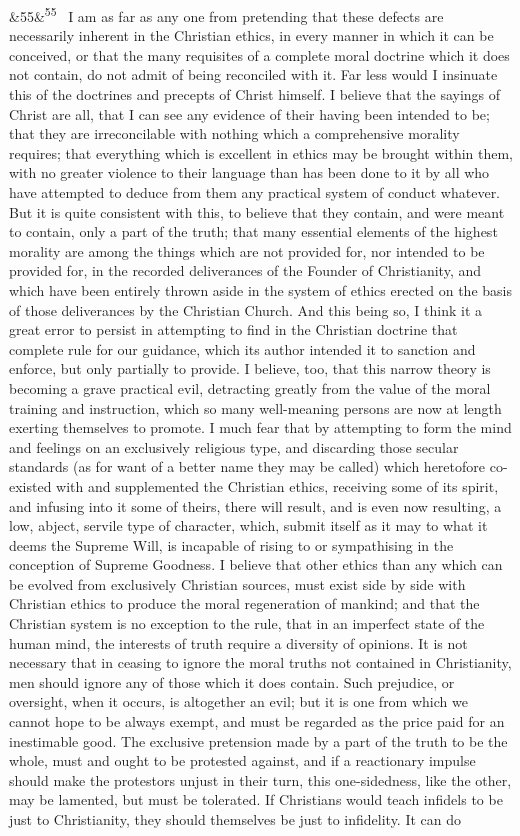 \documentclass[12pt]{article}
\newcommand{\para}[1][]{\par\noindent\ifx&#1&\else\textsuperscript{\footnotesize #1}~\fi}
\begin{document}
\para[55] I am as far as any one from pretending that these defects are necessarily inherent in the Christian ethics, in every manner in which it can be conceived, or that the many requisites of a complete moral doctrine which it does not contain, do not admit of being reconciled with it. Far less would I insinuate this of the doctrines and precepts of Christ himself. I believe that the sayings of Christ are all, that I can see any evidence of their having been intended to be; that they are irreconcilable with nothing which a comprehensive morality requires; that everything which is excellent in ethics may be brought within them, with no greater violence to their language than has been done to it by all who have attempted to deduce from them any practical system of conduct whatever. But it is quite consistent with this, to believe that they contain, and were meant to contain, only a part of the truth; that many essential elements of the highest morality are among the things which are not provided for, nor intended to be provided for, in the recorded deliverances of the Founder of Christianity, and which have been entirely thrown aside in the system of ethics erected on the basis of those deliverances by the Christian Church. And this being so, I think it a great error to persist in attempting to find in the Christian doctrine that complete rule for our guidance, which its author intended it to sanction and enforce, but only partially to provide. I believe, too, that this narrow theory is becoming a grave practical evil, detracting greatly from the value of the moral training and instruction, which so many well-meaning persons are now at length exerting themselves to promote. I much fear that by attempting to form the mind and feelings on an exclusively religious type, and discarding those secular standards (as for want of a better name they may be called) which heretofore co-existed with and supplemented the Christian ethics, receiving some of its spirit, and infusing into it some of theirs, there will result, and is even now resulting, a low, abject, servile type of character, which, submit itself as it may to what it deems the Supreme Will, is incapable of rising to or sympathising in the conception of Supreme Goodness. I believe that other ethics than any which can be evolved from exclusively Christian sources, must exist side by side with Christian ethics to produce the moral regeneration of mankind; and that the Christian system is no exception to the rule, that in an imperfect state of the human mind, the interests of truth require a diversity of opinions. It is not necessary that in ceasing to ignore the moral truths not contained in Christianity, men should ignore any of those which it does contain. Such prejudice, or oversight, when it occurs, is altogether an evil; but it is one from which we cannot hope to be always exempt, and must be regarded as the price paid for an inestimable good. The exclusive pretension made by a part of the truth to be the whole, must and ought to be protested against, and if a reactionary impulse should make the protestors unjust in their turn, this one-sidedness, like the other, may be lamented, but must be tolerated. If Christians would teach infidels to be just to Christianity, they should themselves be just to infidelity. It can do 
\end{document}
